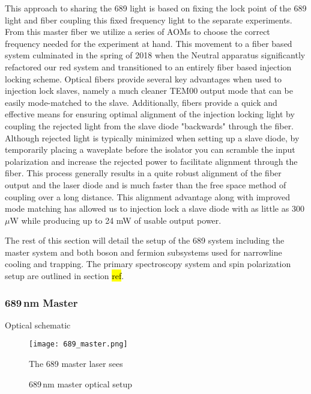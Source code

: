 This approach to sharing the 689 light is based on fixing the lock point of the 689 light and fiber coupling this fixed frequency light to the separate experiments. 
From this master fiber we utilize a series of AOMs to choose the correct frequency needed for the experiment at hand. This movement to a fiber based system culminated in the spring of 2018 when the Neutral apparatus significantly refactored our red system and transitioned to an entirely fiber based injection locking scheme. 
Optical fibers provide several key advantages when used to injection lock slaves, namely a much cleaner TEM00 output mode that can be easily mode-matched to the slave. 
Additionally, fibers provide a quick and effective means for ensuring optimal alignment of the injection locking light by coupling the rejected light from the slave diode "backwards" through the fiber. 
Although rejected light is typically minimized when setting up a slave diode, by temporarily placing a waveplate before the isolator you can scramble the input polarization and increase the rejected power to facilitate alignment through the fiber. 
This process generally results in a quite robust alignment of the fiber output and the laser diode and is much faster than the free space method of coupling over a long distance. 
This alignment advantage along with improved mode matching has allowed us to injection lock a slave diode with as little as 300 $\mu$W while producing up to 24 mW of usable output power.

The rest of this section will detail the setup of the 689 system including the master system and both boson and fermion subsystems used for narrowline cooling and trapping.
The primary spectroscopy system and spin polarization setup are outlined in section \hl{ref}.
	
\subsubsection{689\,nm Master}

Optical schematic
	\begin{figure} 
		\centerline{
		\texttt{[image: 689\_master.png]}}
		\caption{689\,nm master optical setup}{The 689 master laser sees }
		\label{fig:689master}
	\end{figure}

%
%

